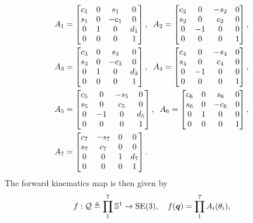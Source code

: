 \begin{align}
  \begin{split}
    A_1 &= \begin{bmatrix} c_1 & 0 & s_1 & 0 \\ s_1 & 0 & -c_1 & 0 \\ 0 & 1 & 0 & d_1 \\ 0 & 0 & 0 & 1\end{bmatrix}, \;\;
    A_2 = \begin{bmatrix} c_2 & 0 & -s_2 & 0 \\ s_2 & 0 & c_2 & 0 \\ 0 & -1 & 0 & 0 \\ 0 & 0 & 0 & 1\end{bmatrix}, \\
    A_3 &= \begin{bmatrix} c_3 & 0 & s_3 & 0 \\ s_3 & 0 & -c_3 & 0 \\ 0 & 1 & 0 & d_3 \\ 0 & 0 & 0 & 1\end{bmatrix}, \;\;
    A_4 = \begin{bmatrix} c_4 & 0 & -s_4 & 0 \\ s_4 & 0 & c_4 & 0 \\ 0 & -1 & 0 & 0 \\ 0 & 0 & 0 & 1\end{bmatrix}, \\
    A_5 &= \begin{bmatrix} c_5 & 0 & -s_5 & 0 \\ s_5 & 0 & c_5 & 0 \\ 0 & -1 & 0 & d_5 \\ 0 & 0 & 0 & 1\end{bmatrix}, \;\;
    A_6 = \begin{bmatrix} c_6 & 0 & s_6 & 0 \\ s_6 & 0 & -c_6 & 0 \\ 0 & 1 & 0 & 0 \\ 0 & 0 & 0 & 1\end{bmatrix}, \\
    A_7 &= \begin{bmatrix} c_7 & -s_7 & 0 & 0 \\ s_7 & c_7 & 0 & 0 \\ 0 & 0 & 1 & d_7 \\ 0 & 0 & 0 & 1\end{bmatrix}. \\
  \end{split}
\end{align}
%
The forward kinematics map is then given by \[ f: \mathcal{Q} \triangleq \prod_1^7
\mathbb{S}^1 \rightarrow \mathrm{SE}(3), \quad f(\bm{q}) = \prod_1^7 A_i(\theta_i), \]
%

